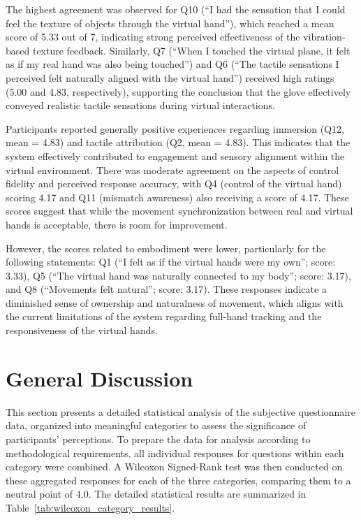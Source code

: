 The highest agreement was observed for Q10 (“I had the sensation that I could feel the texture of objects through the virtual hand”), which reached a mean score of 5.33 out of 7, indicating strong perceived effectiveness of the vibration-based texture feedback. Similarly, Q7 (“When I touched the virtual plane, it felt as if my real hand was also being touched”) and Q6 (“The tactile sensations I perceived felt naturally aligned with the virtual hand”) received high ratings (5.00 and 4.83, respectively), supporting the conclusion that the glove effectively conveyed realistic tactile sensations during virtual interactions.

Participants reported generally positive experiences regarding immersion (Q12, mean = 4.83) and tactile attribution (Q2, mean = 4.83). This indicates that the system effectively contributed to engagement and sensory alignment within the virtual environment. There was moderate agreement on the aspects of control fidelity and perceived response accuracy, with Q4 (control of the virtual hand) scoring 4.17 and Q11 (mismatch awareness) also receiving a score of 4.17. These scores suggest that while the movement synchronization between real and virtual hands is acceptable, there is room for improvement.

However, the scores related to embodiment were lower, particularly for the following statements: Q1 (“I felt as if the virtual hands were my own”; score: 3.33), Q5 (“The virtual hand was naturally connected to my body”; score: 3.17), and Q8 (“Movements felt natural”; score: 3.17). These responses indicate a diminished sense of ownership and naturalness of movement, which aligns with the current limitations of the system regarding full-hand tracking and the responsiveness of the virtual hands.


\section{General Discussion}  

This section presents a detailed statistical analysis of the subjective questionnaire data, organized into meaningful categories to assess the significance of participants' perceptions. To prepare the data for analysis according to methodological requirements, all individual responses for questions within each category were combined. A Wilcoxon Signed-Rank test was then conducted on these aggregated responses for each of the three categories, comparing them to a neutral point of 4.0. The detailed statistical results are summarized in Table~\ref{tab:wilcoxon_category_results}.

